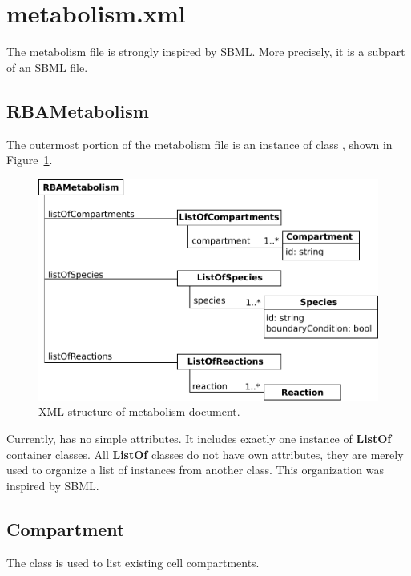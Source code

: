 
\section{metabolism.xml}

The metabolism file is strongly inspired by SBML.\@
More precisely, it is a subpart of an SBML file.


\subsection{RBAMetabolism}
\label{sec:rba_metabolism}

The outermost portion of the metabolism file is an instance of class
\rbametabolism, shown in Figure~\ref{fig:metabolism_doc}.

\begin{figure}
  \centering
  \includegraphics[scale=0.8]{figures/metabolism_doc}
  \caption{XML structure of metabolism document.}
\label{fig:metabolism_doc}
\end{figure}

Currently, \rbametabolism{} has no simple attributes.
It includes exactly one instance of \textbf{ListOf} container classes.
All \textbf{ListOf} classes do not have own attributes,
they are merely used to organize a list of instances from another class.
This organization was inspired by SBML.\@


\subsection{Compartment}
\label{sec:compartment}

The \compartment{} class is used to list existing cell compartments.

